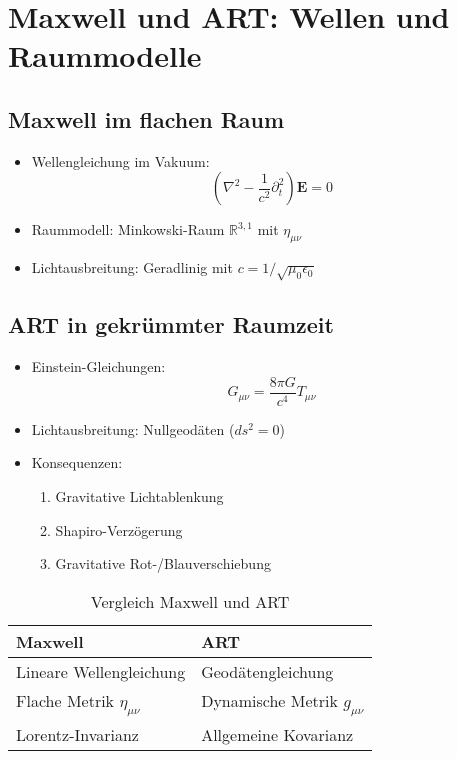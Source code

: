 \section{Maxwell und ART: Wellen und Raummodelle}

\subsection{Maxwell im flachen Raum}
\begin{itemize}[leftmargin=*,noitemsep]
    \item Wellengleichung im Vakuum:
    \[ \left(\nabla^2 - \frac{1}{c^2}\partial_t^2\right)\bm{E} = 0 \]
    \item Raummodell: Minkowski-Raum $\mathbb{R}^{3,1}$ mit $\eta_{\mu\nu}$
    \item Lichtausbreitung: Geradlinig mit $c = 1/\sqrt{\mu_0\epsilon_0}$
\end{itemize}

\subsection{ART in gekrümmter Raumzeit}
\begin{itemize}[leftmargin=*,noitemsep]
    \item Einstein-Gleichungen:
    \[ G_{\mu\nu} = \frac{8\pi G}{c^4}T_{\mu\nu} \]
    \item Lichtausbreitung: Nullgeodäten ($ds^2 = 0$)
    \item Konsequenzen:
    \begin{enumerate}[noitemsep]
        \item Gravitative Lichtablenkung
        \item Shapiro-Verzögerung
        \item Gravitative Rot-/Blauverschiebung
    \end{enumerate}
\end{itemize}

\begin{table}[h]
\centering
\caption{Vergleich Maxwell und ART}
\begin{tabular}{ll}
\toprule
\textbf{Maxwell} & \textbf{ART} \\
\midrule
Lineare Wellengleichung & Geodätengleichung \\
Flache Metrik $\eta_{\mu\nu}$ & Dynamische Metrik $g_{\mu\nu}$ \\
Lorentz-Invarianz & Allgemeine Kovarianz \\
\bottomrule
\end{tabular}
\end{table}

